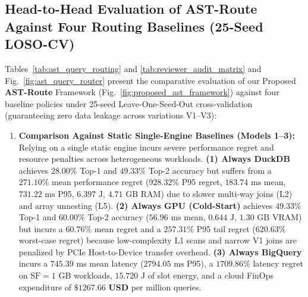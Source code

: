 \documentclass[10pt,a4paper]{article}
\begin{document}
\subsection{Head-to-Head Evaluation of AST-Route Against Four Routing Baselines (25-Seed LOSO-CV)}
Tables~\ref{tab:ast_query_routing} and \ref{tab:reviewer_audit_matrix} and Fig.~\ref{fig:ast_query_router} present the comparative evaluation of our Proposed \textbf{AST-Route} Framework (Fig.~\ref{fig:proposed_ast_framework}) against four baseline policies under 25-seed Leave-One-Seed-Out cross-validation (guaranteeing zero data leakage across variations V1--V3):
\begin{enumerate}[leftmargin=1.5em,itemsep=2pt]
    \item \textbf{Comparison Against Static Single-Engine Baselines (Models 1--3):} Relying on a single static engine incurs severe performance regret and resource penalties across heterogeneous workloads. \textbf{(1) Always DuckDB} achieves $28.00\%$ Top-1 and $49.33\%$ Top-2 accuracy but suffers from a $\mathbf{271.10\%}$ mean performance regret ($928.32\%$ P95 regret, $183.74\text{ ms}$ mean, $731.22\text{ ms}$ P95, $6.397\text{ J}$, $4.71\text{ GB}$ RAM) due to slower multi-way joins (L2) and array unnesting (L5). \textbf{(2) Always GPU (Cold-Start)} achieves $49.33\%$ Top-1 and $60.00\%$ Top-2 accuracy ($56.96\text{ ms}$ mean, $0.644\text{ J}$, $1.30\text{ GB}$ VRAM) but incurs a $\mathbf{60.76\%}$ mean regret and a $\mathbf{257.31\%}$ P95 tail regret ($620.63\%$ worst-case regret) because low-complexity L1 scans and narrow V1 joins are penalized by PCIe Host-to-Device transfer overhead. \textbf{(3) Always BigQuery} incurs a $745.39\text{ ms}$ mean latency ($2794.05\text{ ms}$ P95), a $\mathbf{1709.86\%}$ latency regret on $\text{SF}=1\text{ GB}$ workloads, $15.720\text{ J}$ of slot energy, and a cloud FinOps expenditure of $\mathbf{\$1267.66\text{ USD}}$ per million queries.

\end{enumerate}
\end{document}
